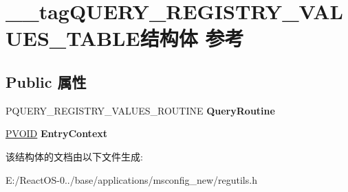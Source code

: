 \hypertarget{struct____tag_q_u_e_r_y___r_e_g_i_s_t_r_y___v_a_l_u_e_s___t_a_b_l_e}{}\section{\+\_\+\+\_\+tag\+Q\+U\+E\+R\+Y\+\_\+\+R\+E\+G\+I\+S\+T\+R\+Y\+\_\+\+V\+A\+L\+U\+E\+S\+\_\+\+T\+A\+B\+L\+E结构体 参考}
\label{struct____tag_q_u_e_r_y___r_e_g_i_s_t_r_y___v_a_l_u_e_s___t_a_b_l_e}
\subsection*{Public 属性}
\begin{DoxyCompactItemize}
\item 
\mbox{\label{struct____tag_q_u_e_r_y___r_e_g_i_s_t_r_y___v_a_l_u_e_s___t_a_b_l_e_af5d56f88bb272361a10a69453a91ff95}} 
P\+Q\+U\+E\+R\+Y\+\_\+\+R\+E\+G\+I\+S\+T\+R\+Y\+\_\+\+V\+A\+L\+U\+E\+S\+\_\+\+R\+O\+U\+T\+I\+NE {\bfseries Query\+Routine}
\item 
\mbox{\label{struct____tag_q_u_e_r_y___r_e_g_i_s_t_r_y___v_a_l_u_e_s___t_a_b_l_e_a731accdcc39ca3b24f659308dcf25520}} 
\hyperlink{interfacevoid}{P\+V\+O\+ID} {\bfseries Entry\+Context}
\end{DoxyCompactItemize}


该结构体的文档由以下文件生成\+:\begin{DoxyCompactItemize}
\item 
E\+:/\+React\+O\+S-\/0../base/applications/msconfig\+\_\+new/regutils.\+h\end{DoxyCompactItemize}
